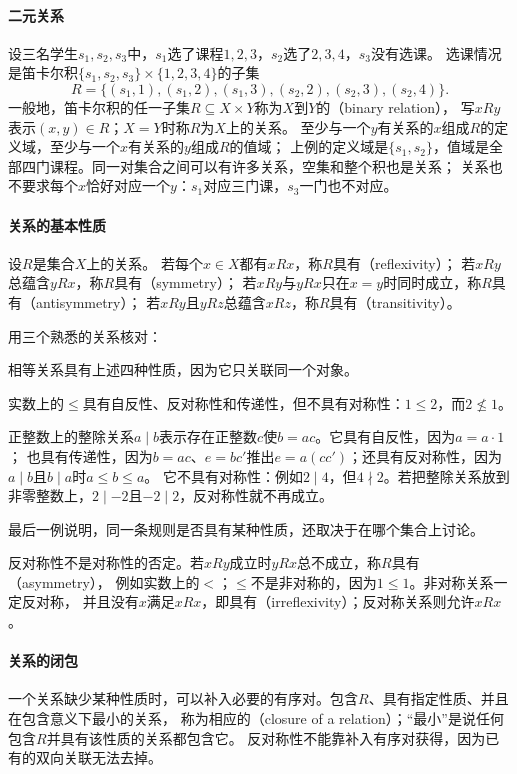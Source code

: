 \paragraph{二元关系}
设三名学生$s_1,s_2,s_3$中，$s_1$选了课程$1,2,3$，$s_2$选了$2,3,4$，$s_3$没有选课。
选课情况是笛卡尔积$\{s_1,s_2,s_3\}\times\{1,2,3,4\}$的子集
\[
 R=\{(s_1,1),(s_1,2),(s_1,3),(s_2,2),(s_2,3),(s_2,4)\}.
\]
一般地，笛卡尔积的任一子集$R\subseteq X\times Y$称为$X$到$Y$的（binary relation），
写$xRy$表示$(x,y)\in R$；$X=Y$时称$R$为$X$上的关系。
至少与一个$y$有关系的$x$组成$R$的定义域，至少与一个$x$有关系的$y$组成$R$的值域；
上例的定义域是$\{s_1,s_2\}$，值域是全部四门课程。同一对集合之间可以有许多关系，空集和整个积也是关系；
关系也不要求每个$x$恰好对应一个$y$：$s_1$对应三门课，$s_3$一门也不对应。

\paragraph{关系的基本性质}
设$R$是集合$X$上的关系。
若每个$x\in X$都有$xRx$，称$R$具有（reflexivity）；
若$xRy$总蕴含$yRx$，称$R$具有（symmetry）；
若$xRy$与$yRx$只在$x=y$时同时成立，称$R$具有（antisymmetry）；
若$xRy$且$yRz$总蕴含$xRz$，称$R$具有（transitivity）。

用三个熟悉的关系核对：

相等关系具有上述四种性质，因为它只关联同一个对象。

实数上的$\leq$具有自反性、反对称性和传递性，但不具有对称性：$1\leq2$，而$2\not\leq1$。

正整数上的整除关系$a\mid b$表示存在正整数$c$使$b=ac$。它具有自反性，因为$a=a\cdot1$；
也具有传递性，因为$b=ac$、$e=bc'$推出$e=a(cc')$；还具有反对称性，因为$a\mid b$且$b\mid a$时$a\leq b\leq a$。
它不具有对称性：例如$2\mid4$，但$4\nmid2$。若把整除关系放到非零整数上，$2\mid-2$且$-2\mid2$，反对称性就不再成立。

最后一例说明，同一条规则是否具有某种性质，还取决于在哪个集合上讨论。

反对称性不是对称性的否定。若$xRy$成立时$yRx$总不成立，称$R$具有（asymmetry），
例如实数上的$<$；$\leq$不是非对称的，因为$1\leq1$。非对称关系一定反对称，
并且没有$x$满足$xRx$，即具有（irreflexivity）；反对称关系则允许$xRx$。

\paragraph{关系的闭包}
一个关系缺少某种性质时，可以补入必要的有序对。包含$R$、具有指定性质、并且在包含意义下最小的关系，
称为相应的（closure of a relation）；“最小”是说任何包含$R$并具有该性质的关系都包含它。
反对称性不能靠补入有序对获得，因为已有的双向关联无法去掉。

